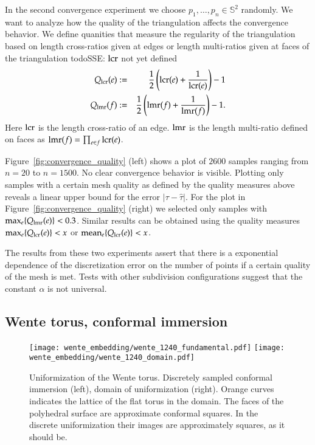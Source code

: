 \documentclass[Thesis.tex]{subfiles}
\begin{document}
In the second convergence experiment we choose $p_1,\ldots,p_n\in \mathbb S^2$ randomly. We want to analyze how the quality of the triangulation affects the convergence behavior. We define quanities that measure the regularity of the triangulation based on length cross-ratios given at edges or length multi-ratios given at faces of the triangulation
todo{SSE: $\operatorname{lcr}$ not yet defined}
\begin{eqnarray*}
	Q_{\operatorname{lcr}}(e) &:=& \frac{1}{2}\left(\operatorname{lcr}(e) + \frac{1}{\operatorname{lcr}(e)}\right) - 1\label{eq:quality_lcr}\\
	Q_{\operatorname{lmr}}(f) &:=& \frac{1}{2}\left(\operatorname{lmr}(f) + \frac{1}{\operatorname{lmr}(f)}\right) - 1\label{eq:quality_lmr}.
\end{eqnarray*}
Here $\operatorname{lcr}$ is the length cross-ratio of an edge. $\operatorname{lmr}$ is the length multi-ratio defined on faces as $\operatorname{lmr}(f)=\prod_{e \in f}\operatorname{lcr}(e)$.

Figure~\ref{fig:convergence_quality} (left) shows a plot of $2600$ samples ranging from $n=20$ to $n=1500$. No clear convergence behavior is visible. Plotting only samples with a certain mesh quality as defined by the quality measures above reveals a linear upper bound for the error $|\tau-\hat \tau|$. For the plot in Figure~\ref{fig:convergence_quality} (right) we selected only samples with $\max_e \{Q_{\operatorname{lmr}}(e)\} < 0.3$. Similar results can be obtained using the quality measures $\max_e \{Q_{\operatorname{lcr}}(e)\} < x$ or $\operatorname{mean}_e \{Q_{\operatorname{lcr}}(e)\} < x$.

The results from these two experiments assert that there is a exponential dependence of the discretization error on the number of points if a certain quality of the mesh is met. Tests with other subdivision configurations suggest that the constant $\alpha$ is not universal.

\subsection{Wente torus, conformal immersion}

\begin{figure}
\centering
\texttt{[image: wente\_embedding/wente\_1240\_fundamental.pdf]}\hfill
\texttt{[image: wente\_embedding/wente\_1240\_domain.pdf]}
\caption{Uniformization of the Wente torus. Discretely sampled conformal immersion (left), domain of uniformization (right). Orange curves indicates the lattice of the flat torus in the domain. The faces of the polyhedral surface are approximate conformal squares. In the discrete uniformization their images are approximately squares, as it should be.}
\end{figure}
\end{document}
